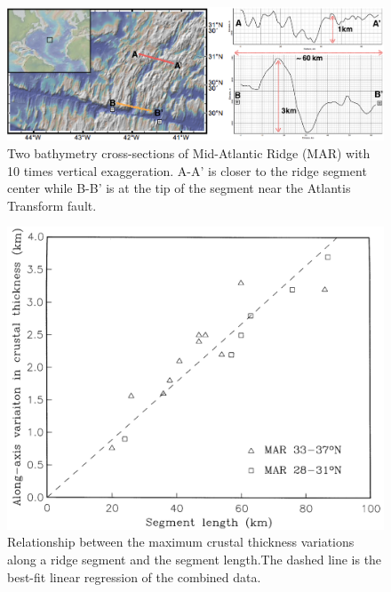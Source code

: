 \documentclass[12pt]{article}
\begin{document}
\begin{figure}[H]
 \centering
  \includegraphics[scale=0.4]{fig2_1.png}
 \caption{\small{Two bathymetry cross-sections of Mid-Atlantic Ridge (MAR) with 10 times vertical exaggeration. A-A' is closer to the ridge segment center while B-B' is at the tip of the segment near the Atlantis Transform fault.}}
 \label{fig2_1}
\end{figure}

\begin{figure}[H]
 \centering
  \includegraphics[scale=0.3]{fig3_1.png}
 \caption{\small{Relationship between the maximum crustal thickness variations along a ridge segment and the segment length.The dashed line is the best-fit linear regression of the combined data. \citep{Chen1999}}}
 \label{fig3_1}
\end{figure}

%
\end{document}
